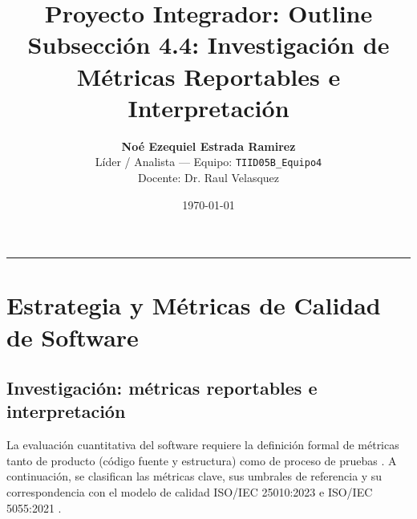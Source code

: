 \documentclass[12pt, letterpaper]{article}
\title{\textbf{Proyecto Integrador: Outline}\\ \large Subsección 4.4: Investigación de Métricas Reportables e Interpretación}
\author{\textbf{Noé Ezequiel Estrada Ramirez} \\ Líder / Analista --- Equipo: \texttt{TIID05B\_Equipo4} \\ Docente: Dr. Raul Velasquez}
\date{\today}
\begin{document}
\maketitle

\hrule
\vspace{0.5cm}


\section{Estrategia y Métricas de Calidad de Software}

\subsection{Investigación: métricas reportables e interpretación}

La evaluación cuantitativa del software requiere la definición formal de métricas tanto de producto (código fuente y estructura) como de proceso de pruebas \cite{iso25010, galin2018}. A continuación, se clasifican las métricas clave, sus umbrales de referencia y su correspondencia con el modelo de calidad ISO/IEC 25010:2023 e ISO/IEC 5055:2021 \cite{iso25023, iso5055}.
\end{document}
